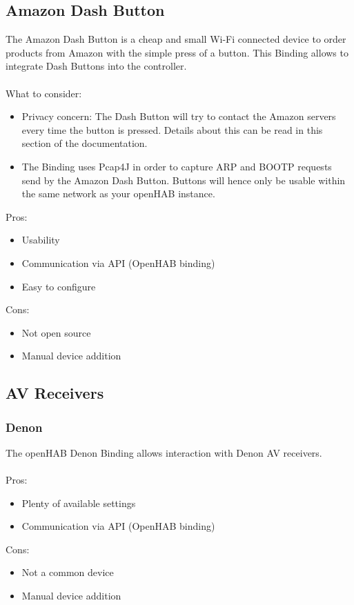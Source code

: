 \subsection{Amazon Dash Button}
The Amazon Dash Button is a cheap and small Wi-Fi connected device to order products from Amazon with the simple press of
a button. This Binding allows to integrate Dash Buttons into the controller.\\~\\
What to consider:
\begin{itemize}
	\item Privacy concern: The Dash Button will try to contact the Amazon servers every time the button is pressed. Details about 
	this can be read in this section of the documentation.
	\item The Binding uses Pcap4J in order to capture ARP and BOOTP requests send by the Amazon Dash Button. Buttons will 
	hence only be usable within the same network as your openHAB instance.
\end{itemize}
Pros:
\begin{itemize}
	\item Usability
	\item Communication via API (OpenHAB binding)
	\item Easy to configure
\end{itemize}
Cons:
\begin{itemize}
	\item Not open source
	\item Manual device addition
\end{itemize}

\subsection{AV Receivers}

\subsubsection{Denon}
The openHAB Denon Binding allows interaction with Denon AV receivers.\\~\\
Pros:
\begin{itemize}
	\item Plenty of available settings
	\item Communication via API (OpenHAB binding)
\end{itemize}
Cons:
\begin{itemize}
	\item Not a common device
	\item Manual device addition
\end{itemize}

